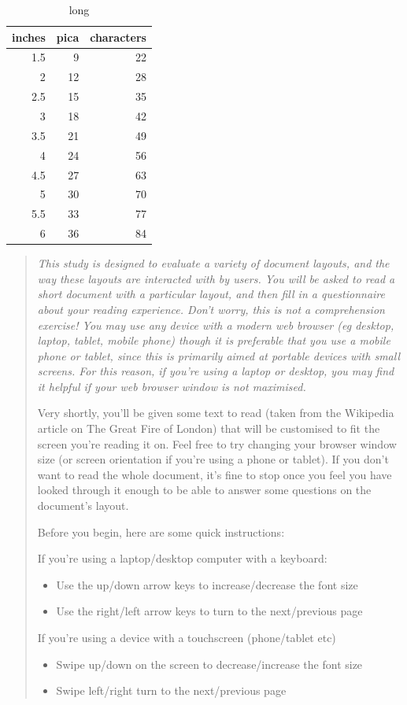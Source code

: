 \begin{table}
\begin{tabular}{rrr}
\toprule
inches & pica & characters \\
\midrule
1.5 & 9 & 22 \\
2 & 12 & 28 \\
2.5 & 15 & 35 \\
3 & 18 & 42 \\
3.5 & 21 & 49 \\
4 & 24 & 56 \\
4.5 & 27 & 63 \\
5 & 30 & 70 \\
5.5 & 33 & 77 \\
6 & 36 & 84 \\
\bottomrule
\end{tabular}
\caption[short]{long}
\end{table}


\begin{quote}
{\slshape
This study is designed to evaluate a variety of document layouts, and the way these layouts are interacted with by users. You will be asked to read a short document with a particular layout, and then fill in a questionnaire about your reading experience. Don't worry, this is not a comprehension exercise! You may use any device with a modern web browser (eg desktop, laptop, tablet, mobile phone) \emph{though it is preferable that you use a mobile phone or tablet, since this is primarily aimed at portable devices with small screens}. For this reason, if you're using a laptop or desktop, you may find it helpful if your web browser window is not maximised.

Very shortly, you'll be given some text to read (taken from the Wikipedia article on The Great Fire of London) that will be customised to fit the screen you're reading it on. Feel free to try changing your browser window size (or screen orientation if you're using a phone or tablet). If you don't want to read the whole document, it's fine to stop once you feel you have looked through it enough to be able to answer some questions on the document's layout.

Before you begin, here are some quick instructions:

If you're using a laptop/desktop computer with a keyboard:
\begin{itemize}
\item Use the up/down arrow keys to increase/decrease the font size
\item Use the right/left arrow keys to turn to the next/previous page
\end{itemize}

If you're using a device with a touchscreen (phone/tablet etc)
\begin{itemize}
\item Swipe up/down on the screen to decrease/increase the font size
\item Swipe left/right turn to the next/previous page
\end{itemize}
}
\end{quote}


